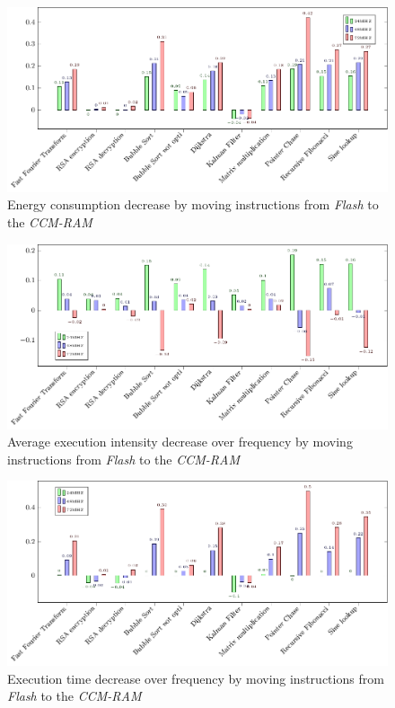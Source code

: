 \documentclass[conference]{IEEEtran}
\begin{document}
\begin{center}
    \begin{figure}[htb]
        \centering
        \includegraphics*{plot/code_ccm_energy.pdf}
        \caption[format=hang]{Energy consumption decrease by moving instructions
        from \emph{Flash} to the \emph{CCM-RAM}} \label{fig:code_ccm_energy}
    \end{figure}
    \begin{figure}[htb]
        \includegraphics*{plot/code_ccm_intensity.pdf}
        \caption[format=hang]{Average execution intensity decrease over
        frequency by moving instructions from \emph{Flash} to the
        \emph{CCM-RAM}} \label{fig:code_ccm_intensity}
    \end{figure}
   \begin{figure}[htb]     
        \includegraphics*{plot/code_ccm_runtime.pdf}
        \caption[format=hang]{Execution time decrease over frequency by moving
        instructions from \emph{Flash} to the \emph{CCM-RAM}}
        \label{fig:code_ccm_intensity}
    \end{figure}
\end{center}
\end{document}
